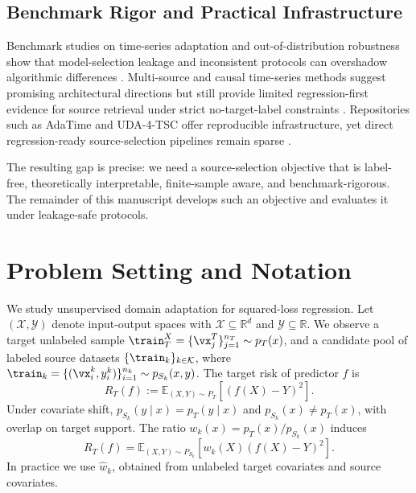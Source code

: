 \documentclass{article} %
\begin{document}
\subsection{Benchmark Rigor and Practical Infrastructure}
Benchmark studies on time-series adaptation and out-of-distribution robustness show that model-selection leakage and inconsistent protocols can overshadow algorithmic differences \citep{Ragab2023AdaTime,Fawaz2023Benchmark,Koh2021WILDS,Zhao2023TTAPitfalls}. Multi-source and causal time-series methods suggest promising architectural directions but still provide limited regression-first evidence for source retrieval under strict no-target-label constraints \citep{Lu2024CauDiTS,Stojanov2023CALDA,Wang2024POND,He2023Raincoat,Yang2025SourceFreeTSDA}. Repositories such as AdaTime and UDA-4-TSC offer reproducible infrastructure, yet direct regression-ready source-selection pipelines remain sparse \citep{AdaTimeRepo2022,UDA4TSCRepo2023,WildsRepo2021,Guo2018MoE,Cui2020MultiSourceAttention}.

The resulting gap is precise: we need a source-selection objective that is label-free, theoretically interpretable, finite-sample aware, and benchmark-rigorous. The remainder of this manuscript develops such an objective and evaluates it under leakage-safe protocols.

\section{Problem Setting and Notation}
We study unsupervised domain adaptation for squared-loss regression. Let \((\mathcal{X},\mathcal{Y})\) denote input-output spaces with \(\mathcal{X}\subseteq \mathbb{R}^d\) and \(\mathcal{Y}\subseteq \mathbb{R}\). We observe a target unlabeled sample \(\train_T^X=\{\vx_j^T\}_{j=1}^{n_T}\sim p_T(x)\), and a candidate pool of labeled source datasets
\(\{\train_k\}_{k\in\mathcal{K}}\), where
\(\train_k=\{(\vx_i^k,y_i^k)\}_{i=1}^{n_k}\sim p_{S_k}(x,y)\).
The target risk of predictor \(f\) is
\begin{equation}
R_T(f) := \mathbb{E}_{(X,Y)\sim P_T}\left[(f(X)-Y)^2\right].
\label{eq:target-risk}
\end{equation}
Under covariate shift, \(p_{S_k}(y\mid x)=p_T(y\mid x)\) and \(p_{S_k}(x)\neq p_T(x)\), with overlap on target support. The ratio \(w_k(x)=p_T(x)/p_{S_k}(x)\) induces
\begin{equation}
R_T(f) = \mathbb{E}_{(X,Y)\sim P_{S_k}}\left[w_k(X)(f(X)-Y)^2\right].
\label{eq:iw-identity}
\end{equation}
In practice we use \(\hat w_k\), obtained from unlabeled target covariates and source covariates.
\end{document}
